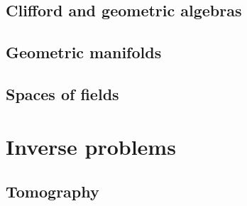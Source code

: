 \documentclass[12pt]{report}
\begin{document}
\section{Clifford and geometric algebras}
\label{subsec:clifford_and_geometric_algebras}


\section{Geometric manifolds}
\label{sec:geometric_manifolds}


\section{Spaces of fields}
\label{sec:spaces_of_fields}


%


\newpage



\chapter{Inverse problems}

\section{Tomography}
\label{sec:calderon_problem}


%
\end{document}
